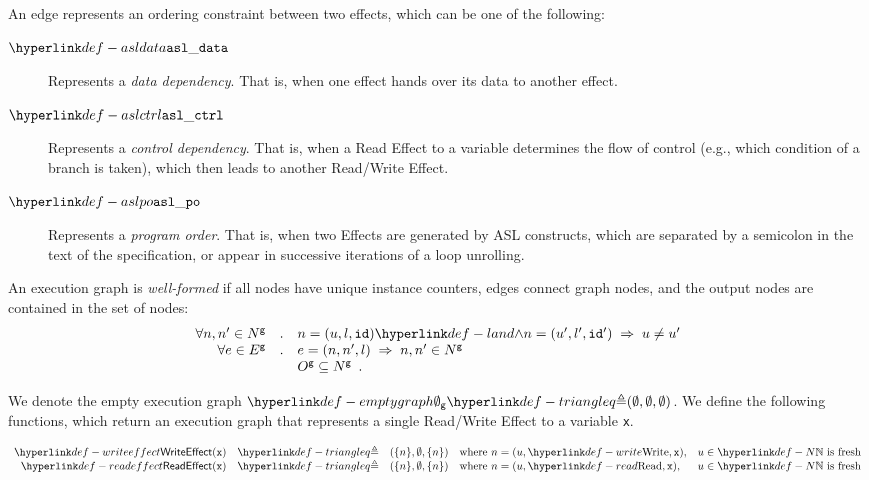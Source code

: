 An edge represents an ordering constraint between two effects, which can be one of the following:
\hypertarget{def-asldata}{}
\begin{description}
\item[$\asldata$] Represents a \emph{data dependency}.
That is, when one effect hands over its data to another effect.
\hypertarget{def-aslctrl}{}
\item[$\aslctrl$] Represents a \emph{control dependency}.
That is, when a Read Effect to a variable determines the flow of control (e.g., which condition of a branch is taken),
which then leads to another Read/Write Effect.
\hypertarget{def-aslpo}{}
\item[$\aslpo$] Represents a \emph{program order}.
That is, when two Effects are generated by ASL constructs, which are separated by a semicolon in the text of the specification,
or appear in successive iterations of a loop unrolling.
\end{description}

An execution graph is \emph{well-formed} if all nodes have unique instance counters, edges connect graph nodes,
and the output nodes are contained in the set of nodes:
\[
  \begin{array}{rcl}
  \forall n, n' \in N^\xgraph &.& n=(u,l,\id) \land n=(u',l',\id') \;\Rightarrow\; u \neq u' \\
  \forall e \in E^\xgraph &.& e=(n, n', l) \;\Rightarrow\; n, n' \in N^\xgraph \\
  & & O^\xgraph \subseteq N^\xgraph \enspace.
  \end{array}
\]
\hypertarget{def-emptygraph}{}

We denote the empty execution graph $\emptygraph \triangleq (\emptyset, \emptyset, \emptyset)$.
%
We define the following functions, which return an execution graph that represents a single Read/Write Effect to a variable \texttt{x}.
\hypertarget{def-writeeffect}{}
\hypertarget{def-readeffect}{}
\begin{definition}
\[
  \begin{array}{rclll}
    \WriteEffect(\vx) &\triangleq& (\{n\}, \emptyset, \{n\}) & \text{where } n=(u, \Write, \vx), & u\in\N \text{ is fresh}\\
    \ReadEffect(\vx)  &\triangleq& (\{n\}, \emptyset, \{n\}) & \text{where } n=(u, \Read, \vx),   & u\in\N \text{ is fresh}\\
  \end{array}
\]
\end{definition}

